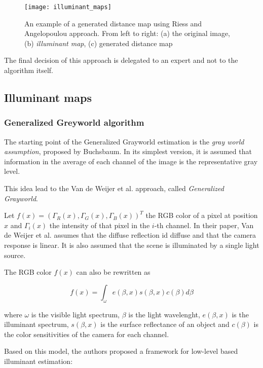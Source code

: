 \begin{figure}
  \centering
    \texttt{[image: illuminant\_maps]}
    \caption{An example of a generated distance map using Riess and Angelopoulou\cite{riess2010scene} approach. From left to right: (a) the original image, (b) \emph{illuminant map}, (c) generated distance map}
    \label{illuminant_maps}
\end{figure}

The final decision of this approach is delegated to an expert and not to the algorithm itself.

\subsection{Illuminant maps}


\subsubsection{Generalized Greyworld algorithm}

The starting point of the Generalized Grayworld estimation is the \emph{gray world assumption}, proposed by Buchsbaum\cite{Buchsbaum19801}. In its simplest version, it is assumed that information in the average of each channel of the image is the representative gray level.

This idea lead to the Van de Weijer et al.\cite{van2007edge} approach, called \emph{Generalized Grayworld}.

Let $f(x) = (\Gamma_R(x), \Gamma_G(x), \Gamma_B(x))^T$ the RGB color of a pixel at position $x$ and $\Gamma_i(x)$ the intensity of that pixel in the $i$-th channel. In their paper, Van de Weijer et al. assumes that the diffuse reflection id diffuse and that the camera response is linear. It is also assumed that the scene is illuminated by a single light source.

The RGB color $f(x)$ can also be rewritten as

\begin{equation}
f(x) = \int_{\omega} e(\beta, x) s(\beta, x) c(\beta) d\beta
\end{equation}

where $\omega$ is the visible light spectrum, $\beta$ is the light wavelenght, $e(\beta, x)$ is the illuminant spectrum, $s(\beta, x)$ is the surface reflectance of an object and $c(\beta)$ is the color sensitivities of the camera for each channel.

Based on this model, the authors proposed a framework for low-level based illuminant estimation:


